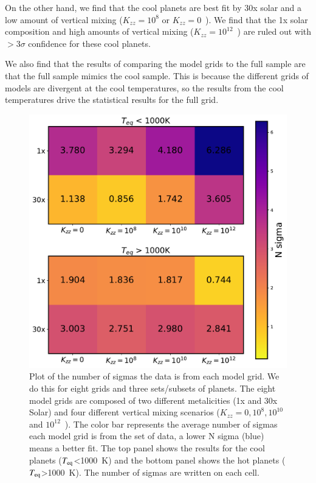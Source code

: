 On the other hand, we find that the cool planets are best fit by 30x solar and a low amount of vertical mixing ($K_{zz} = 10^{8}$ or $K_{zz} = 0$~\cmcms). We find that the 1x solar composition and high amounts of vertical mixing ($K_{zz} = 10^{12}$~\cmcms) are ruled out with $>3\sigma$ confidence for these cool planets.

We also find that the results of comparing the model grids to the full sample are that the full sample mimics the cool sample. This is because the different grids of models are divergent at the cool temperatures, so the results from the cool temperatures drive the statistical results for the full grid.

\begin{figure}
    \centering
    \includegraphics[width=\linewidth]{ShamiModelStatistics.pdf}
    \caption{Plot of the number of sigmas the data is from each model grid. We do this for eight grids and three sets/subsets of planets. The eight model grids are composed of two different metalicities (1x and 30x Solar) and four different vertical mixing scenarios ($K_{zz} = 0, 10^{8}, 10^{10}$ and $10^{12}$~\cmcms). The color bar represents the average number of sigmas each model grid is from the set of data, a lower N sigma (blue) means a better fit. The top panel shows the results for the cool planets ($T_{\rm eq}$<1000~K) and the bottom panel shows the  hot planets ($T_{\rm eq}$>1000~K). The number of sigmas are written on each cell.}
    \label{P1:fig:gridstats}
\end{figure}

